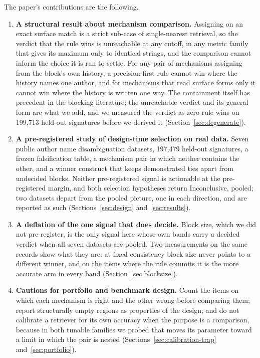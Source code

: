 \documentclass[11pt]{article}
\begin{document}
The paper's contributions are the following.

\begin{enumerate}
\item \textbf{A structural result about mechanism comparison.} Assigning on
an exact surface match is a strict sub-case of single-nearest retrieval, so
the verdict that the rule wins is unreachable at any cutoff, in any metric
family that gives its maximum only to identical strings, and the comparison
cannot inform the choice it is run to settle. For any pair of mechanisms
assigning from the block's own history, a precision-first rule cannot win
where the history names one author, and for mechanisms that read surface forms
only it cannot win where the history is written one way. The containment
itself has precedent in the blocking literature; the unreachable verdict and
its general form are what we add, and we measured the verdict as zero rule
wins on 199{,}713 held-out signatures before we derived it
(Section~\ref{sec:degenerate}).
\item \textbf{A pre-registered study of design-time selection on real data.}
Seven public author name disambiguation datasets, 197{,}479 held-out
signatures, a frozen falsification table, a mechanism pair in which neither
contains the other, and a winner construct that keeps demonstrated ties apart
from undecided blocks. Neither pre-registered signal is actionable at the
pre-registered margin, and both selection hypotheses return Inconclusive,
pooled; two datasets depart from the pooled picture, one in each direction,
and are reported as such (Sections~\ref{sec:design} and~\ref{sec:results}).
\item \textbf{A deflation of the one signal that does decide.} Block size,
which we did not pre-register, is the only signal here whose own bands carry a decided verdict when all seven datasets are pooled. Two measurements on the same records show
what they are: at fixed consistency block size never points to a different
winner, and on the items where the rule commits it is the more accurate arm in
every band
(Section~\ref{sec:blocksize}).
\item \textbf{Cautions for portfolio and benchmark design.} Count the items
on which each mechanism is right and the other wrong before comparing them;
report structurally empty regions as properties of the design; and do not
calibrate a retriever for its own accuracy when the purpose is a comparison,
because in both tunable families we probed that moves its parameter toward a
limit in which the pair is nested
(Sections~\ref{sec:calibration-trap} and~\ref{sec:portfolio}).
\end{enumerate}
\end{document}
